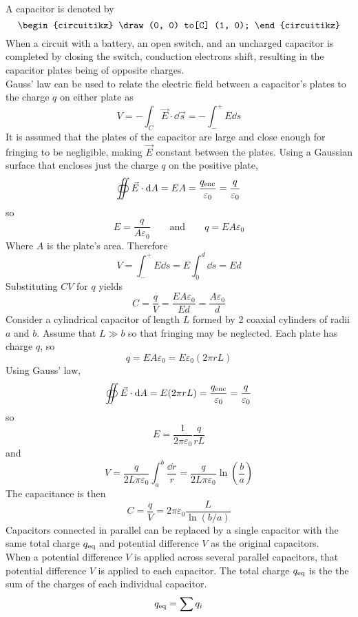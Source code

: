 \documentclass[./Electricity and Magnetism.tex]{subfiles}
\begin{document}
			A capacitor is denoted by
			\[\begin{circuitikz}
				\draw (0, 0) to[C] (1, 0);
			\end{circuitikz}\]
		When a circuit with a battery, an open switch, and an uncharged capacitor is completed by closing the switch, conduction electrons shift, resulting in the capacitor plates being of opposite charges. \\
		Gauss' law can be used to relate the electric field between a capacitor's plates to the charge \(q\) on either plate as
			\[
				V = -\int_C \vec{E} \cdot \dd{\vec{s}}
					= -\int_-^+ E \dd{s}
			\]
			It is assumed that the plates of the capacitor are large and close enough for fringing to be negligible, making \(\vec{E}\) constant between the plates. Using a Gaussian surface that encloses just the charge \(q\) on the positive plate,
			\[
				\oiint \vec{E} \cdot \dd{A} = EA
					= \frac{q_{\text{enc}}}{\varepsilon_0} = \frac{q}{\varepsilon_0} 
			\]
			so
			\[
				E = \frac{q}{A\varepsilon_0} \qquad \text{and} \qquad
				q = EA\varepsilon_0
			\]
			Where \(A\) is the plate's area. Therefore
			\[
				V = \int_-^+ E\dd{s}
					= E\int_0^d \dd{s}
					= Ed
			\]
			Substituting \(CV\) for \(q\) yields 
			\[
				C = \frac{q}{V} 
					= \frac{EA\varepsilon_0}{Ed}
					= \frac{A\varepsilon_0}{d}
					\tag{parallel-plate capacitor}
			\]
		Consider a cylindrical capacitor of length \(L\) formed by 2 coaxial cylinders of radii \(a\) and \(b\). Assume that \(L \gg b\) so that fringing may be neglected. Each plate has charge \(q\), so			
			\[
				q = EA\varepsilon_0 = 
					E\varepsilon_0(2\pi rL)
			\]
			Using Gauss' law,
			\[
				\oiint \vec{E} \cdot \dd{A} 
					= E(2\pi rL)
					= \frac{q_{\text{enc}}}{\varepsilon_0}
					= \frac{q}{\varepsilon_0}
			\]
			so
			\[E = \frac{1}{2\pi\varepsilon_0}\frac{q}{rL}\]
			and
			\[
				V = \frac{q}{2L\pi\varepsilon_0}\int_a^b\frac{\dd{r}}{r}
					= \frac{q}{2L\pi\varepsilon_0}\ln(\frac{b}{a})
			\]
			The capacitance is then
			\[
				C = \frac{q}{V}
					= 2\pi\varepsilon_0\frac{L}{\ln(b/a)}
					\tag{cylindrical capacitor}
			\]
		Capacitors connected in parallel can be replaced by a single capacitor with the same total charge \(q_{\text{eq}}\) and potential difference \(V\) as the original capacitors. \\
			When a potential difference \(V\) is applied across several parallel capacitors, that potential difference \(V\) is applied to each capacitor. The total charge \(q_{\text{eq}}\) is the the sum of the charges of each individual capacitor.
			\[q_{\text{eq}} = \sum q_i\]
\end{document}
